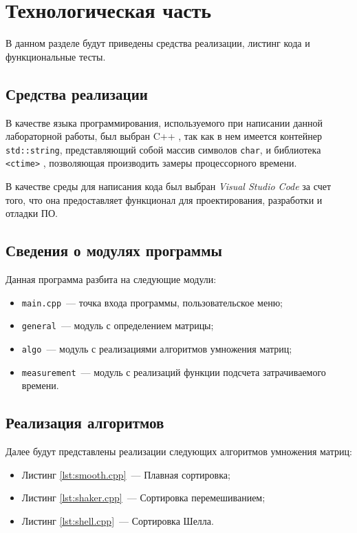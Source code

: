 \chapter{Технологическая часть}
В данном разделе будут приведены средства реализации, листинг кода и функциональные тесты.

\section{Средства реализации}

В качестве языка программирования, используемого при написании данной лабораторной работы, был выбран C++ \cite{cpp-lang}, так как в нем имеется контейнер \texttt{std::string}, представляющий собой массив символов \texttt{char}, и библиотека \texttt{<ctime>} \cite{ctime}, позволяющая производить замеры процессорного времени.

В качестве среды для написания кода был выбран \textit{Visual Studio Code} за счет того, что она предоставляет функционал для проектирования, разработки и отладки ПО.

\section{Сведения о модулях программы}

Данная программа разбита на следующие модули:

\begin{itemize}
    \item \texttt{main.cpp}~--- точка входа программы, пользовательское меню;
    \item \texttt{general}~--- модуль с определением матрицы;
    \item \texttt{algo}~--- модуль с реализациями алгоритмов умножения матриц;
    \item \texttt{measurement}~--- модуль с реализаций функции подсчета затрачиваемого времени.
\end{itemize}

\clearpage

\section{Реализация алгоритмов}

Далее будут представлены реализации следующих алгоритмов умножения матриц:
\begin{itemize}
    \item Листинг \ref{lst:smooth.cpp}~--- Плавная сортировка;
    \item Листинг \ref{lst:shaker.cpp}~--- Сортировка перемешиванием;
    \item Листинг \ref{lst:shell.cpp}~--- Сортировка Шелла.
\end{itemize}




